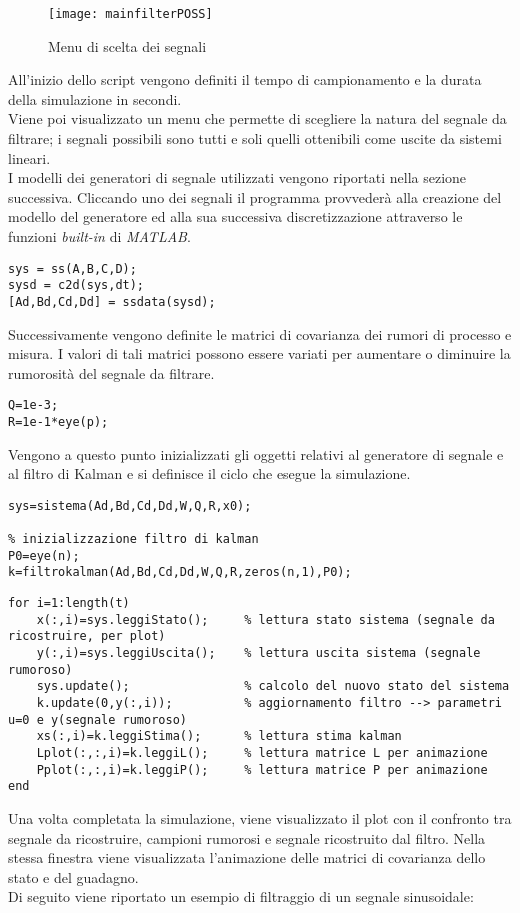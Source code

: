 \begin{wrapfigure}[18]{R}{0.4\textwidth}
\centering
\texttt{[image: mainfilterPOSS]} 
\caption{Menu di scelta dei segnali}
\end{wrapfigure}
All'inizio dello script vengono definiti il tempo di campionamento e la durata della simulazione in secondi.\\
Viene poi visualizzato un menu che permette di scegliere la natura del segnale da filtrare; i segnali possibili sono tutti e soli quelli ottenibili come uscite da sistemi lineari.\\
I modelli dei generatori di segnale utilizzati vengono riportati nella sezione successiva.
Cliccando uno dei segnali il programma provvederà alla creazione del modello del generatore ed alla sua successiva discretizzazione attraverso le funzioni \textit{built-in} di \textit{MATLAB}.
\begin{lstlisting}[frame=single]
sys = ss(A,B,C,D);
sysd = c2d(sys,dt); 
[Ad,Bd,Cd,Dd] = ssdata(sysd);
\end{lstlisting}
Successivamente vengono definite le matrici di covarianza dei rumori di processo e misura. I valori di tali matrici possono essere variati per aumentare o diminuire la rumorosità del segnale da filtrare.
\begin{lstlisting}[frame=single]
Q=1e-3;
R=1e-1*eye(p);
\end{lstlisting}
Vengono a questo punto inizializzati gli oggetti relativi al generatore di segnale e al filtro di Kalman e si definisce il ciclo che esegue la simulazione.
\begin{lstlisting}[frame=single]
% inizializzazione sistema generatore di segnale rumoroso
sys=sistema(Ad,Bd,Cd,Dd,W,Q,R,x0);

% inizializzazione filtro di kalman
P0=eye(n);
k=filtrokalman(Ad,Bd,Cd,Dd,W,Q,R,zeros(n,1),P0);
\end{lstlisting}
\newpage
\begin{lstlisting}[frame=single]
%% simulazione
for i=1:length(t)
	x(:,i)=sys.leggiStato();     % lettura stato sistema (segnale da ricostruire, per plot)
	y(:,i)=sys.leggiUscita();    % lettura uscita sistema (segnale rumoroso)
	sys.update();                % calcolo del nuovo stato del sistema
	k.update(0,y(:,i));          % aggiornamento filtro --> parametri u=0 e y(segnale rumoroso)
	xs(:,i)=k.leggiStima();      % lettura stima kalman
	Lplot(:,:,i)=k.leggiL();     % lettura matrice L per animazione
	Pplot(:,:,i)=k.leggiP();     % lettura matrice P per animazione
end
\end{lstlisting}
Una volta completata la simulazione, viene visualizzato il plot con il confronto tra segnale da ricostruire, campioni rumorosi e segnale ricostruito dal filtro.
Nella stessa finestra viene visualizzata l'animazione delle matrici di covarianza dello stato e del guadagno.\\
Di seguito viene riportato un esempio di filtraggio di un segnale sinusoidale:

